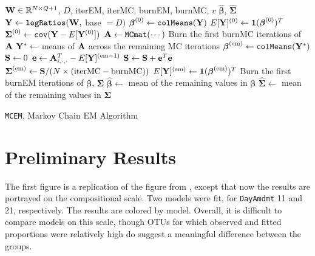 \documentclass{template}
\begin{document}
\begin{algorithm}[ht!]
\begin{algorithmic}[1]
\Input  $\mathbf{W}\in\mathbb{R}^{N\times Q+1}$, $D$,  iterEM, iterMC, burnEM, burnMC, $v$
\Output $\hat{\boldsymbol{\beta}}$, $\hat{\boldsymbol{\Sigma}}$
\State $\mathbf{Y}\gets \texttt{logRatios}(\mathbf{W},$ base $=D)$
\State $\boldsymbol{\beta}^{(0)} \gets \texttt{colMeans}(\mathbf{Y})$
\State $E[\mathbf{Y}]^{(0)} \gets \mathbf{1}(\boldsymbol{\beta}^{(0)})^T$
\State $\boldsymbol{\Sigma}^{(0)} \gets \texttt{cov}(\mathbf{Y}-E[\mathbf{Y}^{(0)}])$
\State $\mathbf{A}\gets \texttt{MCmat}(\cdots)$
\State Burn the first burnMC iterations of $\mathbf{A}$
\State $\mathbf{Y}^*\gets$ means of $\mathbf{A}$ across the remaining MC iterations
\State $\boldsymbol{\beta}^{(\text{em})} \gets \texttt{colMeans}(\mathbf{Y}^*)$
\State $\mathbf{S}\gets 0$
\State $\mathbf{e}\gets \mathbf{A}_{i,\cdot,\cdot}^T-E[\mathbf{Y}]^{(\text{em}-1)}$
\State $\mathbf{S}\gets \mathbf{S}+\mathbf{e}^T\mathbf{e}$
\EndFor
\State $\boldsymbol{\Sigma}^{(\text{em})}\gets \mathbf{S}/(N\times (\text{iterMC}-\text{burnMC}))$
\State $E[\mathbf{Y}]^{(\text{em})} \gets \mathbf{1}(\boldsymbol{\beta}^{(\text{em})})^T$
\EndFor
\State Burn the first burnEM iterations of $\boldsymbol{\beta}$, $\boldsymbol{\Sigma}$
\State $\hat{\boldsymbol{\beta}}\gets$ mean of the remaining values in $\boldsymbol{\beta}$
\State $\hat{\boldsymbol{\Sigma}}\gets$ mean of the remaining values in $\boldsymbol{\Sigma}$
\end{algorithmic}
\caption{\texttt{MCEM}, Markov Chain EM Algorithm}
\end{algorithm}



\FloatBarrier

\newpage

\section{Preliminary Results}

The first figure is a replication of the figure from \cite{xia2013logistic}, except that now the results are portrayed on the compositional scale. Two models were fit, for \texttt{DayAmdmt} 11 and 21, respectively. The results are colored by model. Overall, it is difficult to compare models on this scale, though OTUs for which observed and fitted proportions were relatively high do suggest a meaningful difference between the groups.

\end{document}

